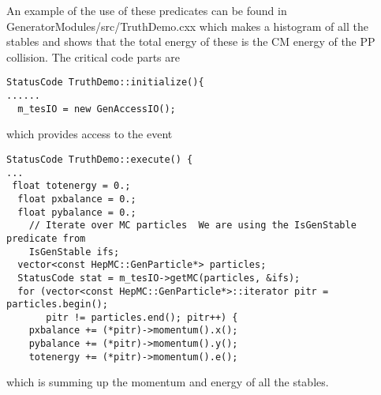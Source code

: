 \documentclass[11pt]{article}
\begin{document}
An example of the use of these predicates can be found in
GeneratorModules/src/TruthDemo.cxx which makes a histogram of all the
stables and shows that the total energy of these is the CM energy of
the PP collision. The critical code parts are
\begin{verbatim}
StatusCode TruthDemo::initialize(){
......
  m_tesIO = new GenAccessIO();
\end{verbatim}
which provides access to the event

 \begin{verbatim}
StatusCode TruthDemo::execute() {
...
 float totenergy = 0.;
  float pxbalance = 0.;
  float pybalance = 0.;
    // Iterate over MC particles  We are using the IsGenStable predicate from
    IsGenStable ifs;
  vector<const HepMC::GenParticle*> particles;
  StatusCode stat = m_tesIO->getMC(particles, &ifs);
  for (vector<const HepMC::GenParticle*>::iterator pitr = particles.begin();
       pitr != particles.end(); pitr++) {          
    pxbalance += (*pitr)->momentum().x();
    pybalance += (*pitr)->momentum().y();
    totenergy += (*pitr)->momentum().e();
\end{verbatim}
which is summing up the momentum and energy of all the stables. 
 
\end{document}
